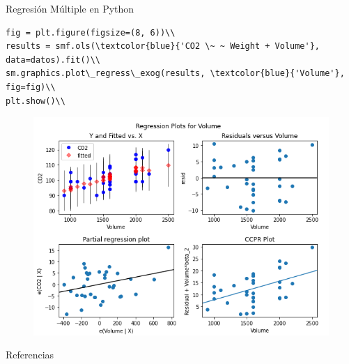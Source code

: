 \documentclass{beamer}
\begin{document}
\begin{frame}{Regresión Múltiple en Python}
\scriptsize
\begin{verbatim}
fig = plt.figure(figsize=(8, 6))\\
results = smf.ols(\textcolor{blue}{'CO2 \~ ~ Weight + Volume'}, data=datos).fit()\\
sm.graphics.plot\_regress\_exog(results, \textcolor{blue}{'Volume'}, fig=fig)\\
plt.show()\\
\end{verbatim}
\begin{figure}
\includegraphics[width=.65\textwidth]{output3.png}
\end{figure}
\end{frame}

\begin{frame}[allowframebreaks]{Referencias}
\tiny

 
\end{frame}
\end{document}
